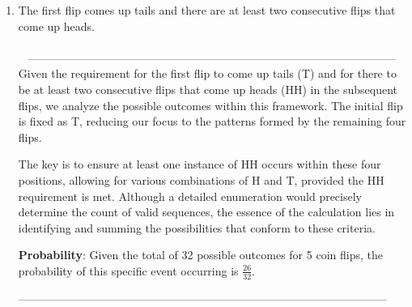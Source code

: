 \documentclass{amsart}
\theoremstyle{definition}
\theoremstyle{Exercise}
\theoremstyle{remark}
\theoremstyle{rule}
\numberwithin{equation}{section}
\begin{document}
\begin{enumerate}[label=(\alph*)]
\\\\\
\item The first flip comes up tails and there are at least two consecutive flips that come up heads.\\\\\
--------------------------------------------------------------------------------------------------\\
Given the requirement for the first flip to come up tails (T) and for there to be at least two consecutive flips that come up heads (HH) in the subsequent flips, we analyze the possible outcomes within this framework. The initial flip is fixed as T, reducing our focus to the patterns formed by the remaining four flips. 

The key is to ensure at least one instance of HH occurs within these four positions, allowing for various combinations of H and T, provided the HH requirement is met. Although a detailed enumeration would precisely determine the count of valid sequences, the essence of the calculation lies in identifying and summing the possibilities that conform to these criteria.


\textbf{Probability}: Given the total of 32 possible outcomes for 5 coin flips, the probability of this specific event occurring is $\frac{26}{32}$.

--------------------------------------------------------------------------------------------------\\
\\\\\
\end{enumerate}

 \newpage
\end{document}
